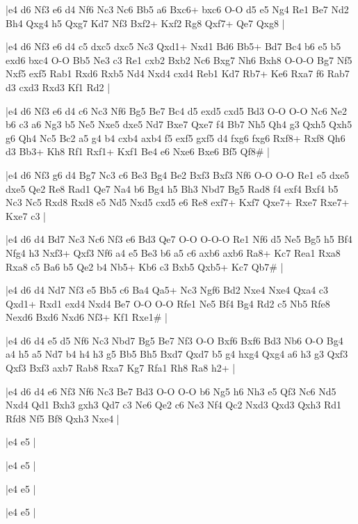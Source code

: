 \whitename{}
\blackname{}
\makegametitle
|e4 d6 Nf3 e6 d4 Nf6 Nc3 Nc6 Bb5 a6 Bxc6+ bxc6 O-O d5 e5 Ng4 Re1 Be7 Nd2 Bh4 Qxg4 h5 Qxg7 Kd7 Nf3 Bxf2+ Kxf2 Rg8 Qxf7+ Qe7 Qxg8  |

\whitename{}
\blackname{}
\makegametitle
|e4 d6 Nf3 e6 d4 c5 dxc5 dxc5 Nc3 Qxd1+ Nxd1 Bd6 Bb5+ Bd7 Bc4 b6 e5 b5 exd6 bxc4 O-O Bb5 Ne3 c3 Re1 cxb2 Bxb2 Nc6 Bxg7 Nh6 Bxh8 O-O-O Bg7 Nf5 Nxf5 exf5 Rab1 Rxd6 Rxb5 Nd4 Nxd4 cxd4 Reb1 Kd7 Rb7+ Ke6 Rxa7 f6 Rab7 d3 cxd3 Rxd3 Kf1 Rd2  |

\whitename{}
\blackname{}
\makegametitle
|e4 d6 Nf3 e6 d4 c6 Nc3 Nf6 Bg5 Be7 Bc4 d5 exd5 cxd5 Bd3 O-O O-O Nc6 Ne2 b6 c3 a6 Ng3 b5 Ne5 Nxe5 dxe5 Nd7 Bxe7 Qxe7 f4 Bb7 Nh5 Qh4 g3 Qxh5 Qxh5 g6 Qh4 Nc5 Bc2 a5 g4 b4 cxb4 axb4 f5 exf5 gxf5 d4 fxg6 fxg6 Rxf8+ Rxf8 Qh6 d3 Bb3+ Kh8 Rf1 Rxf1+ Kxf1 Be4 e6 Nxe6 Bxe6 Bf5 Qf8\#  |

\whitename{}
\blackname{}
\makegametitle
|e4 d6 Nf3 g6 d4 Bg7 Nc3 c6 Be3 Bg4 Be2 Bxf3 Bxf3 Nf6 O-O O-O Re1 e5 dxe5 dxe5 Qe2 Re8 Rad1 Qe7 Na4 b6 Bg4 h5 Bh3 Nbd7 Bg5 Rad8 f4 exf4 Bxf4 b5 Nc3 Nc5 Rxd8 Rxd8 e5 Nd5 Nxd5 cxd5 e6 Re8 exf7+ Kxf7 Qxe7+ Rxe7 Rxe7+ Kxe7 c3  |

\whitename{}
\blackname{}
\makegametitle
|e4 d6 d4 Bd7 Nc3 Nc6 Nf3 e6 Bd3 Qe7 O-O O-O-O Re1 Nf6 d5 Ne5 Bg5 h5 Bf4 Nfg4 h3 Nxf3+ Qxf3 Nf6 a4 e5 Be3 b6 a5 c6 axb6 axb6 Ra8+ Kc7 Rea1 Rxa8 Rxa8 c5 Ba6 b5 Qe2 b4 Nb5+ Kb6 c3 Bxb5 Qxb5+ Kc7 Qb7\#  |

\whitename{}
\blackname{}
\makegametitle
|e4 d6 d4 Nd7 Nf3 e5 Bb5 c6 Ba4 Qa5+ Nc3 Ngf6 Bd2 Nxe4 Nxe4 Qxa4 c3 Qxd1+ Rxd1 exd4 Nxd4 Be7 O-O O-O Rfe1 Ne5 Bf4 Bg4 Rd2 c5 Nb5 Rfe8 Nexd6 Bxd6 Nxd6 Nf3+ Kf1 Rxe1\#  |

\whitename{}
\blackname{}
\makegametitle
|e4 d6 d4 e5 d5 Nf6 Nc3 Nbd7 Bg5 Be7 Nf3 O-O Bxf6 Bxf6 Bd3 Nb6 O-O Bg4 a4 h5 a5 Nd7 b4 h4 h3 g5 Bb5 Bh5 Bxd7 Qxd7 b5 g4 hxg4 Qxg4 a6 h3 g3 Qxf3 Qxf3 Bxf3 axb7 Rab8 Rxa7 Kg7 Rfa1 Rh8 Ra8 h2+  |

\whitename{}
\blackname{}
\makegametitle
|e4 d6 d4 e6 Nf3 Nf6 Nc3 Be7 Bd3 O-O O-O b6 Ng5 h6 Nh3 e5 Qf3 Nc6 Nd5 Nxd4 Qd1 Bxh3 gxh3 Qd7 c3 Ne6 Qe2 c6 Ne3 Nf4 Qc2 Nxd3 Qxd3 Qxh3 Rd1 Rfd8 Nf5 Bf8 Qxh3 Nxe4  |

\whitename{}
\blackname{}
\makegametitle
|e4 e5  |

\whitename{}
\blackname{}
\makegametitle
|e4 e5  |

\whitename{}
\blackname{}
\makegametitle
|e4 e5  |

\whitename{}
\blackname{}
\makegametitle
|e4 e5  |

